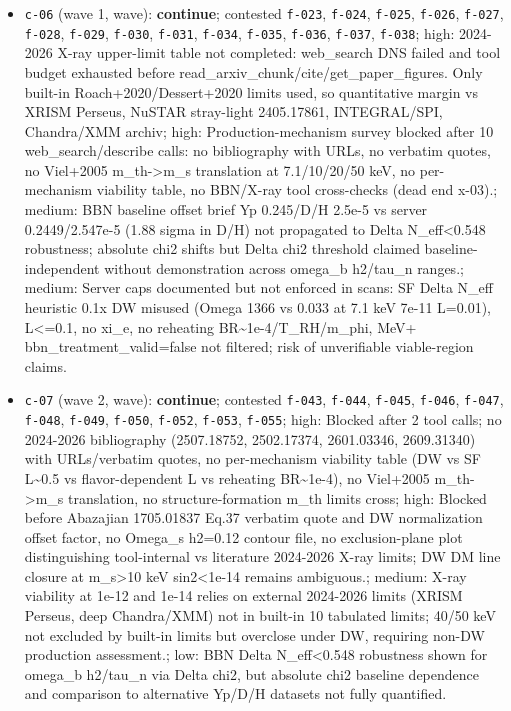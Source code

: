 \documentclass[11pt,a4paper]{article}
\begin{document}
\begin{itemize}
  \item \texttt{c-06} (wave 1, wave): \textbf{continue}; contested \texttt{f-023}, \texttt{f-024}, \texttt{f-025}, \texttt{f-026}, \texttt{f-027}, \texttt{f-028}, \texttt{f-029}, \texttt{f-030}, \texttt{f-031}, \texttt{f-034}, \texttt{f-035}, \texttt{f-036}, \texttt{f-037}, \texttt{f-038}; high: 2024-2026 X-ray upper-limit table not completed: web\_search DNS failed and tool budget exhausted before read\_arxiv\_chunk/cite/get\_paper\_figures. Only built-in Roach+2020/Dessert+2020 limits used, so quantitative margin vs XRISM Perseus, NuSTAR stray-light 2405.17861, INTEGRAL/SPI, Chandra/XMM archiv; high: Production-mechanism survey blocked after 10 web\_search/describe calls: no bibliography with URLs, no verbatim quotes, no Viel+2005 m\_th-\textgreater{}m\_s translation at 7.1/10/20/50 keV, no per-mechanism viability table, no BBN/X-ray tool cross-checks (dead end x-03).; medium: BBN baseline offset brief Yp 0.245/D/H 2.5e-5 vs server 0.2449/2.547e-5 (1.88 sigma in D/H) not propagated to Delta N\_eff\textless{}0.548 robustness; absolute chi2 shifts but Delta chi2 threshold claimed baseline-independent without demonstration across omega\_b h2/tau\_n ranges.; medium: Server caps documented but not enforced in scans: SF Delta N\_eff heuristic 0.1x DW misused (Omega 1366 vs 0.033 at 7.1 keV 7e-11 L=0.01), L\textless{}=0.1, no xi\_e, no reheating BR\textasciitilde{}1e-4/T\_RH/m\_phi, MeV+ bbn\_treatment\_valid=false not filtered; risk of unverifiable viable-region claims.
  \item \texttt{c-07} (wave 2, wave): \textbf{continue}; contested \texttt{f-043}, \texttt{f-044}, \texttt{f-045}, \texttt{f-046}, \texttt{f-047}, \texttt{f-048}, \texttt{f-049}, \texttt{f-050}, \texttt{f-052}, \texttt{f-053}, \texttt{f-055}; high: Blocked after 2 tool calls; no 2024-2026 bibliography (2507.18752, 2502.17374, 2601.03346, 2609.31340) with URLs/verbatim quotes, no per-mechanism viability table (DW vs SF L\textasciitilde{}0.5 vs flavor-dependent L vs reheating BR\textasciitilde{}1e-4), no Viel+2005 m\_th-\textgreater{}m\_s translation, no structure-formation m\_th limits cross; high: Blocked before Abazajian 1705.01837 Eq.37 verbatim quote and DW normalization offset factor, no Omega\_s h2=0.12 contour file, no exclusion-plane plot distinguishing tool-internal vs literature 2024-2026 X-ray limits; DW DM line closure at m\_s\textgreater{}10 keV sin2\textless{}1e-14 remains ambiguous.; medium: X-ray viability at 1e-12 and 1e-14 relies on external 2024-2026 limits (XRISM Perseus, deep Chandra/XMM) not in built-in 10 tabulated limits; 40/50 keV not excluded by built-in limits but overclose under DW, requiring non-DW production assessment.; low: BBN Delta N\_eff\textless{}0.548 robustness shown for omega\_b h2/tau\_n via Delta chi2, but absolute chi2 baseline dependence and comparison to alternative Yp/D/H datasets not fully quantified.

\end{itemize}
\end{document}
